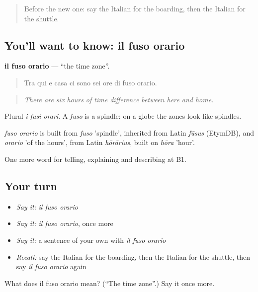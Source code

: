 \label{lesson:IT-C425-fuso-orario}



\begin{quote}
Before the new one: say the Italian for the boarding, then the Italian for the shuttle.
\end{quote}

\subsection*{You'll want to know: il fuso orario}
\textbf{il fuso orario} — \textquotedblleft{}the time zone\textquotedblright{}.

\begin{quote}
Tra qui e casa ci sono sei ore di fuso orario.
\end{quote}

\begin{quote}
\emph{There are six hours of time difference between here and home.}
\end{quote}

Plural \emph{i fusi orari}. A \emph{fuso} is a spindle: on a globe the zones look like spindles.

\begin{cousinweb}
\emph{fuso orario} is built from \emph{fuso} 'spindle', inherited from Latin \emph{fūsus} (EtymDB), and \emph{orario} 'of the hours', from Latin \emph{hōrārius}, built on \emph{hōra} 'hour'.
\end{cousinweb}

\begin{grammarlens}[title={What you've built}]
One more word for telling, explaining and describing at B1.
\end{grammarlens}

\subsection*{Your turn}
\begin{itemize}
\raggedright
  \item \emph{Say it:} \emph{il fuso orario}
  \item \emph{Say it:} \emph{il fuso orario}, once more
  \item \emph{Say it:} a sentence of your own with \emph{il fuso orario}
  \item \emph{Recall:} say the Italian for the boarding, then the Italian for the shuttle, then say \emph{il fuso orario} again
\end{itemize}

\begin{tcolorbox}[breakable,colback=teal!4,colframe=teal!35!black,title={Before you move on}]
What does il fuso orario mean? (\textquotedblleft{}The time zone\textquotedblright{}.) Say it once more.
\end{tcolorbox}
